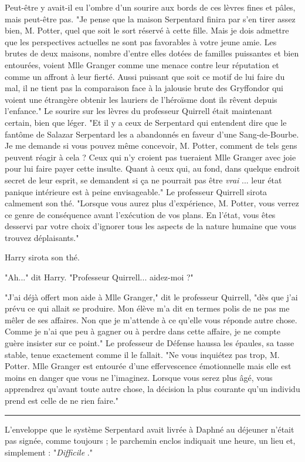 Peut-être y avait-il eu l'ombre d'un sourire aux bords de ces lèvres fines et pâles, mais peut-être pas. "Je pense que la maison Serpentard finira par s'en tirer assez bien, M. Potter, quel que soit le sort réservé à cette fille. Mais je dois admettre que les perspectives actuelles ne sont pas favorables à votre jeune amie. Les brutes de deux maisons, nombre d'entre elles dotées de familles puissantes et bien entourées, voient Mlle Granger comme une menace contre leur réputation et comme un affront à leur fierté. Aussi puissant que soit ce motif de lui faire du mal, il ne tient pas la comparaison face à la jalousie brute des Gryffondor qui voient une étrangère obtenir les lauriers de l'héroïsme dont ils rêvent depuis l'enfance." Le sourire sur les lèvres du professeur Quirrell était maintenant certain, bien que léger. "Et il y a ceux de Serpentard qui entendent dire que le fantôme de Salazar Serpentard les a abandonnés en faveur d'une Sang-de-Bourbe. Je me demande si vous pouvez même concevoir, M. Potter, comment de tels gens peuvent réagir à cela ? Ceux qui n'y croient pas tueraient Mlle Granger avec joie pour lui faire payer cette insulte. Quant à ceux qui, au fond, dans quelque endroit secret de leur esprit, se demandent si ça ne pourrait pas être \emph{vrai} ... leur état panique intérieure est à peine envisageable." Le professeur Quirrell sirota calmement son thé. "Lorsque vous aurez plus d'expérience, M. Potter, vous verrez ce genre de conséquence avant l'exécution de vos plans. En l'état, vous êtes desservi par votre choix d'ignorer tous les aspects de la nature humaine que vous trouvez déplaisants."

Harry sirota son thé.

"Ah..." dit Harry. "Professeur Quirrell... aidez-moi ?"

"J'ai déjà offert mon aide à Mlle Granger," dit le professeur Quirrell, "dès que j'ai prévu ce qui allait se produire. Mon élève m'a dit en termes polis de ne pas me mêler de ses affaires. Non que je m'attende à ce qu'elle vous réponde autre chose. Comme je n'ai que peu à gagner ou à perdre dans cette affaire, je ne compte guère insister sur ce point." Le professeur de Défense haussa les épaules, sa tasse stable, tenue exactement comme il le fallait. "Ne vous inquiétez pas trop, M. Potter. Mlle Granger est entourée d'une effervescence émotionnelle mais elle est moins en danger que vous ne l'imaginez. Lorsque vous serez plus âgé, vous apprendrez qu'avant toute autre chose, la décision la plus courante qu'un individu prend est celle de ne rien faire."
\par\noindent\rule{\textwidth}{0.4pt}
L'enveloppe que le système Serpentard avait livrée à Daphné au déjeuner n'était pas signée, comme toujours ; le parchemin enclos indiquait une heure, un lieu et, simplement : "\emph{Difficile} ."

